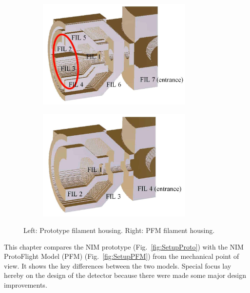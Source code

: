 	\begin{figure}[h!] %
		\begin{subfigure}{0.5\textwidth}
			\centering
			\includegraphics[width =0.85\textwidth]{Setup/Proto_FilEl_sim.jpg}
		\end{subfigure}
		\begin{subfigure}{0.5\textwidth}
			\centering
			\includegraphics[width = 0.85\textwidth]{Setup/PFM_FilEl_sim.jpg}
		\end{subfigure}
		\caption{Left: Prototype filament housing. Right: PFM filament housing.}
		\label{fig:SetupFilElSim}
	\end{figure}
	This chapter compares the NIM prototype (Fig.~\ref{fig:SetupProto}) with the NIM ProtoFlight Model (PFM) (Fig.~\ref{fig:SetupPFM}) from the mechanical point of view. It shows the key differences between the two models. Special focus lay hereby on the design of the detector because there were made some major design improvements.\\
